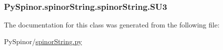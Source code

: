 \subsubsection[{S\+U3}]{\setlength{\rightskip}{0pt plus 5cm}Py\+Spinor.\+spinor\+String.\+spinor\+String.\+S\+U3}\label{class_py_spinor_1_1spinor_string_1_1spinor_string_a3f8abb6e2d071f76f0f6260fb9184351}


The documentation for this class was generated from the following file\+:\begin{DoxyCompactItemize}
\item 
Py\+Spinor/\hyperlink{spinor_string_8py}{spinor\+String.\+py}\end{DoxyCompactItemize}

